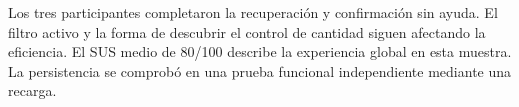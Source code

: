 Los tres participantes completaron la recuperación y confirmación sin ayuda. El filtro activo y la forma de descubrir el control de cantidad siguen afectando la eficiencia. El SUS medio de 80/100 describe la experiencia global en esta muestra. La persistencia se comprobó en una prueba funcional independiente mediante una recarga.
